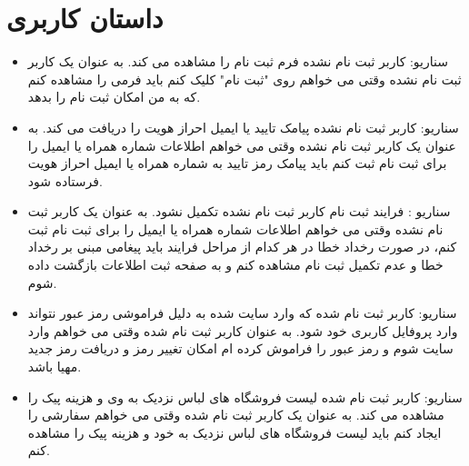\documentclass[14pt]{article}
\begin{document}
 
\section{داستان کاربری}

\begin{flushright}
\begin{itemize}
\item سناریو: کاربر ثبت نام نشده فرم ثبت نام را مشاهده می کند.
\newline
به عنوان یک کاربر ثبت نام نشده
\newline
وقتی می خواهم روی "ثبت نام" کلیک کنم
\newline
باید فرمی را مشاهده کنم که به من امکان ثبت نام را بدهد.  

\item سناریو: کاربر ثبت نام نشده پیامک تایید یا ایمیل احراز هویت را دریافت می کند.
\newline
به عنوان یک کاربر ثبت نام نشده
\newline
وقتی می خواهم اطلاعات شماره همراه یا ایمیل را برای ثبت نام ثبت کنم
\newline
باید پیامک رمز تایید به شماره همراه یا ایمیل احراز هویت فرستاده شود.

\item سناریو :‌ فرایند ثبت نام کاربر ثبت نام نشده تکمیل نشود.
\newline
به عنوان یک کاربر ثبت نام نشده
\newline
وقتی می خواهم اطلاعات شماره همراه یا ایمیل را برای ثبت نام ثبت کنم، در صورت رخداد خطا در هر کدام از مراحل فرایند
\newline
باید پیغامی مبنی بر رخداد خطا و عدم تکمیل ثبت نام مشاهده کنم و به صفحه ثبت اطلاعات بازگشت داده شوم.
\item سناریو: کاربر ثبت نام شده که وارد سایت شده به دلیل فراموشی رمز عبور نتواند وارد پروفایل کاربری خود شود.
\newline
به عنوان کاربر ثبت نام شده
\newline
وقتی می خواهم وارد سایت شوم و رمز عبور را فراموش کرده ام
\newline
امکان تغییر رمز و دریافت رمز جدید مهیا باشد.

\item سناریو: کاربر ثبت نام شده لیست فروشگاه های لباس نزدیک به وی و هزینه پیک را مشاهده می کند.
\newline
به عنوان یک کاربر ثبت نام شده
\newline
وقتی می خواهم سفارشی را ایجاد کنم
\newline
باید لیست فروشگاه های لباس نزدیک به خود و هزینه پیک را مشاهده کنم.


\end{itemize}
\end{flushright}
\end{document}
